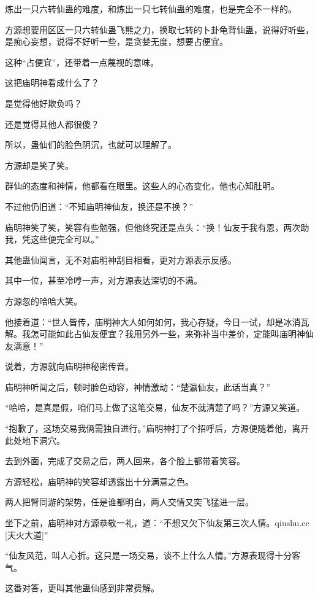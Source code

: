 
\begin{this_body}

炼出一只六转仙蛊的难度，和炼出一只七转仙蛊的难度，也是完全不一样的。

方源想要用区区一只六转仙蛊飞熊之力，换取七转的卜卦龟背仙蛊，说得好听些，是痴心妄想，说得不好听一些，是贪婪无度，想要占便宜。

这种“占便宜”，还带着一点蔑视的意味。

这把庙明神看成什么了？

是觉得他好欺负吗？

还是觉得其他人都很傻？

所以，蛊仙们的脸色阴沉，也就可以理解了。

方源却是笑了笑。

群仙的态度和神情，他都看在眼里。这些人的心态变化，他也心知肚明。

不过他仍旧道：“不知庙明神仙友，换还是不换？”

庙明神笑了笑，笑容有些勉强，但他终究还是点头：“换！仙友于我有恩，两次助我，凭这些便完全可以。”

其他蛊仙闻言，无不对庙明神刮目相看，更对方源表示反感。

其中一位，甚至冷哼一声，对方源表达深切的不满。

方源忽的哈哈大笑。

他接着道：“世人皆传，庙明神大人如何如何，我心存疑，今日一试，却是冰消瓦解。我怎可能如此占仙友便宜？我用另外一些，来弥补当中差价，定能叫庙明神仙友满意！”

说着，方源就向庙明神秘密传音。

庙明神听闻之后，顿时脸色动容，神情激动：“楚瀛仙友，此话当真？”

“哈哈，是真是假，咱们马上做了这笔交易，仙友不就清楚了吗？”方源又笑道。

“抱歉了，这场交易我俩需独自进行。”庙明神打了个招呼后，方源便随着他，离开此处地下洞穴。

去到外面，完成了交易之后，两人回来，各个脸上都带着笑容。

方源轻松，庙明神的笑容却透露出十分满意之色。

两人把臂同游的架势，任是谁都明白，两人交情又突飞猛进一层。

坐下之前，庙明神对方源恭敬一礼，道：“不想又欠下仙友第三次人情。qiushu.cc [天火大道]”

“仙友风范，叫人心折。这只是一场交易，谈不上什么人情。”方源表现得十分客气。

这番对答，更叫其他蛊仙感到非常费解。


\end{this_body}
